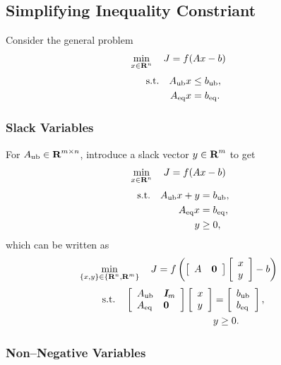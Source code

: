 \documentclass{article}
\begin{document}
\clearpage

\subsection{Simplifying Inequality Constriant}

    Consider the general problem
    \begin{align*}
        \min_{x\in\textbf{R}^n}\quad J&=f(Ax-b)
    \end{align*}
    \begin{align*}
        \text{s.t.}\quad A_{\text{ub}} &x \leq b_{\text{ub}},\\
        A_{\text{eq}} &x = b_{\text{eq}}.
    \end{align*}

\subsubsection{Slack Variables}

    For $A_{\text{ub}}\in\textbf{R}^{m\times n}$, introduce a slack vector $y\in\textbf{R}^m$ to get
    \begin{align*}
        \min_{x\in\textbf{R}^n}\quad J&=f(Ax-b)
    \end{align*}
    \begin{align*}
        \text{s.t.}\quad A_{\text{ub}} x+y&= b_{\text{ub}},\\
        A_{\text{eq}} x &= b_{\text{eq}},\\
        y&\geq0,
    \end{align*}
    which can be written as
    \begin{align*}
        \min_{\{x,y\}\in\{\textbf{R}^n,\textbf{R}^m\}}\quad J&=f\left(\left[\begin{array}{lllllllllllllllllll}A & \textbf{0} \end{array}\right] \left[\begin{array}{lllllllllllllllllll}x \\ y\end{array}\right] -b\right)
    \end{align*}
    \begin{align*}
        \text{s.t.}\quad \left[\begin{array}{lllllllllllllllllll}A_{\text{ub}} & \emph{\textbf{I}}_m \\ A_{\text{eq}} & \textbf{0} \end{array}\right]\left[\begin{array}{lllllllllllllllllll}x\\y\end{array}\right] &= \left[\begin{array}{lllllllllllllllllll} b_{\text{ub}} \\ b_{\text{eq}}\end{array}\right],\\
        &y\geq 0.
    \end{align*}
\subsubsection{Non--Negative Variables}
\end{document}
